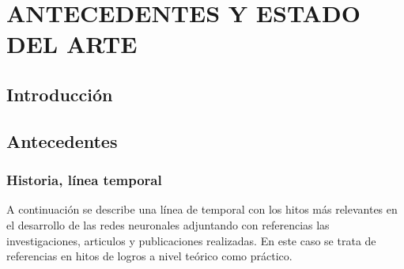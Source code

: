 \chapter{ANTECEDENTES Y ESTADO DEL ARTE}
\label{ch:2}
\section{Introducción}


\section{Antecedentes}


\newpage
\subsection{Historia, línea temporal}

A continuación se describe una línea de temporal con los hitos más relevantes en el desarrollo de las redes neuronales adjuntando con referencias las investigaciones, articulos y publicaciones realizadas.
En este caso se trata de referencias en hitos de logros a nivel teórico como práctico.

